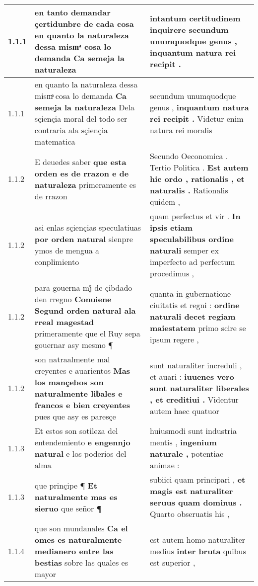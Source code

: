 \begin{tabular}{|p{1cm}|p{6.5cm}|p{6.5cm}|}

\hline
1.1.1 & en tanto demandar çertidunbre de cada cosa \textbf{ en quanto la naturaleza dessa mismͣ cosa lo demanda } Ca semeja la naturaleza & intantum certitudinem inquirere \textbf{ secundum unumquodque genus , } inquantum natura rei recipit . \\\hline
1.1.1 & en quanto la naturaleza dessa mismͣ cosa lo demanda \textbf{ Ca semeja la naturaleza } Dela sçiençia moral del todo ser contraria ala sçiençia matematica & secundum unumquodque genus , \textbf{ inquantum natura rei recipit . } Videtur enim natura rei moralis \\\hline
1.1.2 & E deuedes saber \textbf{ que esta orden es de rrazon e de naturaleza } primeramente es de rrazon & Secundo Oeconomica . Tertio Politica . \textbf{ Est autem hic ordo , rationalis , et naturalis . } Rationalis quidem , \\\hline
1.1.2 & asi enlas sçiençias speculatiuas \textbf{ por orden natural } sienpre ymos de mengua a conplimiento & quam perfectus et vir . \textbf{ In ipsis etiam speculabilibus ordine naturali } semper ex imperfecto ad perfectum procedimus , \\\hline
1.1.2 & para gouerna mj̊ de çibdado den rregno \textbf{ Conuiene Segund orden natural ala rreal magestad } primeramente que el Ruy sepa gouernar asy mesmo ¶ & quanta in gubernatione ciuitatis et regni : \textbf{ ordine naturali decet regiam maiestatem } primo scire se ipsum regere , \\\hline
1.1.2 & son natraalmente mal creyentes e auarientos \textbf{ Mas los mançebos son naturalmente liƀales e francos e bien creyentes } pues que asy es paresçe & sunt naturaliter increduli , et auari : \textbf{ iuuenes vero sunt naturaliter liberales , et creditiui . } Videntur autem haec quatuor \\\hline
1.1.3 & Et estos son sotileza del entendemiento \textbf{ e engennjo natural } e los poderios del alma & huiusmodi sunt industria mentis , \textbf{ ingenium naturale , } potentiae animae : \\\hline
1.1.3 & que prinçipe ¶ \textbf{ Et naturalmente mas es sieruo } que señor ¶ & subiici quam principari , \textbf{ et magis est naturaliter seruus quam dominus . } Quarto obseruatis his , \\\hline
1.1.4 & que son mundanales \textbf{ Ca el omes es naturalmente medianero entre las bestias } sobre las quales es mayor & est autem homo naturaliter medius \textbf{ inter bruta } quibus est superior , \\\hline

\end{tabular}
